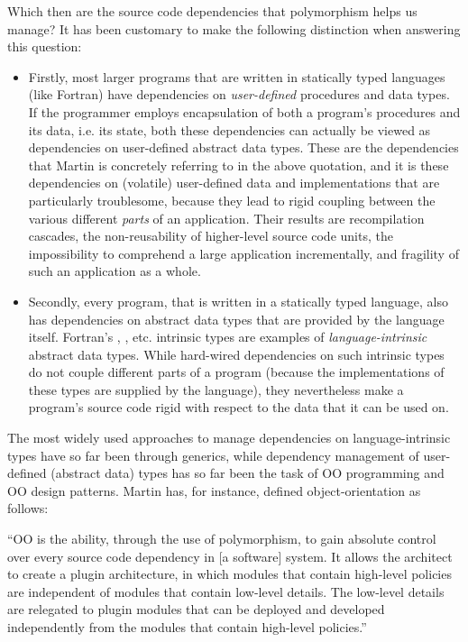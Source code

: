 \documentclass[11pt,oneside]{report}
\newcommand{\code}[1]{{\selectfont\ttfamily{#1}}}
\begin{document}
Which then are the source code dependencies that polymorphism helps us
manage? It has been customary to make the following distinction when
answering this question:
\begin{itemize}
\item
  Firstly, most larger programs that are written in statically typed
  languages (like Fortran) have dependencies on \emph{user-defined}
  procedures and data types. If the programmer employs encapsulation
  of both a program's procedures and its data, i.e. its state, both
  these dependencies can actually be viewed as dependencies on
  user-defined abstract data types. These are the dependencies that
  Martin is concretely referring to in the above quotation, and it is
  these dependencies on (volatile) user-defined data and
  implementations that are particularly troublesome, because they lead
  to rigid coupling between the various different \emph{parts} of an
  application. Their results are recompilation cascades, the
  non-reusability of higher-level source code units, the impossibility
  to comprehend a large application incrementally, and fragility of
  such an application as a whole.
\item
  Secondly, every program, that is written in a statically typed
  language, also has dependencies on abstract data types that are
  provided by the language itself. Fortran's \code{integer},
  \code{real}, etc. intrinsic types are examples of
  \emph{language-intrinsic} abstract data types. While hard-wired
  dependencies on such intrinsic types do not couple different parts
  of a program (because the implementations of these types are
  supplied by the language), they nevertheless make a program's source
  code rigid with respect to the data that it can be used on.
\end{itemize}

The most widely used approaches to manage dependencies on
language-intrinsic types have so far been through generics, while
dependency management of user-defined (abstract data) types has so far
been the task of OO programming and OO design patterns. Martin
\cite{Martin_17} has, for instance, defined object-orientation as
follows:

\begin{displayquote}
  ``OO is the ability, through the use of polymorphism, to gain
  absolute control over every source code dependency in [a software]
  system. It allows the architect to create a plugin architecture, in
  which modules that contain high-level policies are independent of
  modules that contain low-level details. The low-level details are
  relegated to plugin modules that can be deployed and developed
  independently from the modules that contain high-level policies.''
\end{displayquote}
\end{document}

